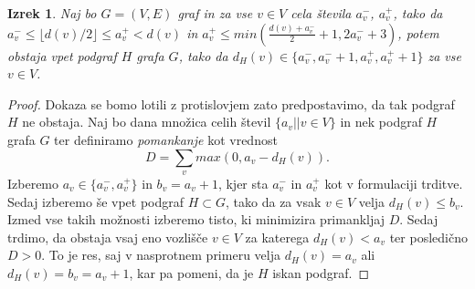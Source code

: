\documentclass[12pt,a4paper,twoside]{article}
\theoremstyle{definition} %
\theoremstyle{plain} %
\newtheorem{izrek}[definicija]{Izrek}
\numberwithin{equation}{section}  %
\begin{document}
\begin{izrek}
\label{factor}
Naj bo $G = (V, E)$ graf in za vse $v \in V$ cela števila $a_v^-$, $a_v^+$, tako da $a_v^- \le \lfloor d(v)/2 \rfloor \le a_v^+ < d(v)$ in $a_v^+ \le min \left( \frac{d(v) + a_v^-}{2} + 1, 2a_v^- + 3 \right)$, potem obstaja vpet podgraf $H$ grafa $G$, tako da $d_H(v) \in \{ a_v^-, a_v^- + 1, a_v^+, a_v^+ + 1\}$ za vse $v \in V$.
\end{izrek}

\begin{proof}
Dokaza se bomo lotili z protislovjem zato predpostavimo, da tak podgraf $H$ ne obstaja. Naj bo dana množica celih števil $\{ a_v  || v \in V\}$ in nek podgraf $H$ grafa $G$ ter definiramo \textit{pomankanje} kot vrednost
$$D = \sum_v max(0, a_v - d_H(v)) .$$ 
Izberemo $a_v \in \{a_v^-, a_v^+\}$ in $b_v = a_v +1$, kjer sta $a_v^-$ in $a_v^+$ kot v formulaciji trditve. Sedaj izberemo še vpet podgraf $H \subset G$, tako da za vsak $v \in V$ velja $d_H(v) \le b_v$. Izmed vse takih možnosti izberemo tisto, ki minimizira primankljaj $D$.  Sedaj trdimo, da obstaja vsaj eno vozlišče $v \in V$ za katerega $d_H(v) < a_v$ ter posledično $D > 0$. To je res, saj v nasprotnem primeru  velja $d_H(v) = a_v$ ali $d_H(v) = b_v = a_v + 1$, kar pa pomeni, da je $H$ iskan podgraf.


\end{proof}
\end{document}
